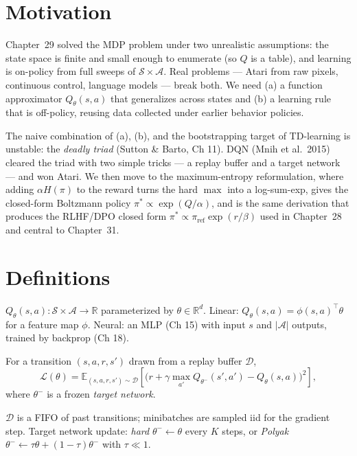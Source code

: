 \section*{Motivation}

Chapter~29 solved the MDP problem under two unrealistic assumptions: the state space is finite and small enough to enumerate (so $Q$ is a table), and learning is on-policy from full sweeps of $\mathcal{S}\times\mathcal{A}$. Real problems --- Atari from raw pixels, continuous control, language models --- break both. We need (a) a function approximator $Q_\theta(s,a)$ that generalizes across states and (b) a learning rule that is off-policy, reusing data collected under earlier behavior policies.

The naive combination of (a), (b), and the bootstrapping target of TD-learning is unstable: the \emph{deadly triad} (Sutton \& Barto, Ch 11). DQN (Mnih et al.\ 2015) cleared the triad with two simple tricks --- a replay buffer and a target network --- and won Atari. We then move to the maximum-entropy reformulation, where adding $\alpha H(\pi)$ to the reward turns the hard $\max$ into a log-sum-exp, gives the closed-form Boltzmann policy $\pi^* \propto \exp(Q/\alpha)$, and is the same derivation that produces the RLHF/DPO closed form $\pi^*\propto\pi_{\mathrm{ref}}\exp(r/\beta)$ used in Chapter~28 and central to Chapter~31.

\section*{Definitions}

\begin{definition}
$Q_\theta(s,a):\mathcal{S}\times\mathcal{A}\to\mathbb{R}$ parameterized by $\theta\in\mathbb{R}^d$. Linear: $Q_\theta(s,a)=\phi(s,a)^\top\theta$ for a feature map $\phi$. Neural: an MLP (Ch 15) with input $s$ and $|\mathcal{A}|$ outputs, trained by backprop (Ch 18).
\end{definition}

\begin{definition}
For a transition $(s,a,r,s')$ drawn from a replay buffer $\mathcal{D}$,
\[
\mathcal{L}(\theta)=\mathbb{E}_{(s,a,r,s')\sim\mathcal{D}}\!\left[\big(r+\gamma\max_{a'}Q_{\theta^-}(s',a')-Q_\theta(s,a)\big)^2\right],
\]
where $\theta^-$ is a frozen \emph{target network}.
\end{definition}

\begin{definition}
$\mathcal{D}$ is a FIFO of past transitions; minibatches are sampled iid for the gradient step. Target network update: \emph{hard} $\theta^-\leftarrow\theta$ every $K$ steps, or \emph{Polyak} $\theta^-\leftarrow\tau\theta+(1-\tau)\theta^-$ with $\tau\ll 1$.
\end{definition}

